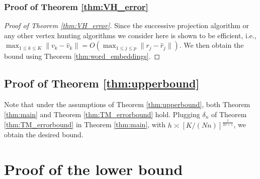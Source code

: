 \documentclass[preprint,11pt]{article}
\numberwithin{equation}{section}
\begin{document}
\subsubsection{Proof of Theorem \ref{thm:VH_error}}
\begin{proof}[Proof of Theorem \ref{thm:VH_error}]
    Since the successive projection algorithm or any other vertex hunting algorithms we consider here is shown to be efficient, i.e., $\max_{1\le k\le K} \|v_k-\hat{v}_k\|= O(\max_{1\le j\le p}\|r_j-\hat{r}_j\|)$. We then obtain the bound using Theorem \ref{thm:word_embeddings}.
\end{proof}


\subsection{Proof of Theorem \ref{thm:upperbound}}
Note that under the assumptions of Theorem \ref{thm:upperbound}, both Theorem \ref{thm:main} and Theorem \ref{thm:TM_errorbound} hold. Plugging $\delta_n$ of Theorem \ref{thm:TM_errorbound} in Theorem \ref{thm:main}, with $h\asymp [K/(Nn)]^{\frac{1}{2\beta+1}}$, we obtain the desired bound.



\section{Proof of the lower bound} \label{supp:LBproofs}
\end{document}
